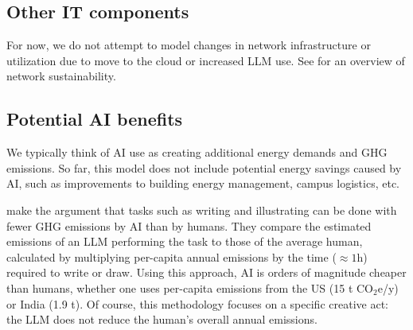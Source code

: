 \documentclass[11pt]{article}
\begin{document}
\subsection{Other IT components}

For now, we do not attempt to model changes in network infrastructure or utilization due to
move to the cloud or increased LLM use. See \textcite{jacob2023} for an overview of
network sustainability.

\subsection{Potential AI benefits}

We typically think of AI use as creating additional energy demands and GHG emissions.
So far, this model does not include potential energy savings caused by AI, such as improvements
to building energy management, campus logistics, etc.

\textcite{tomlinson2024carbon} make the argument that tasks such as writing
and illustrating can be done with fewer GHG emissions by AI than by humans. They compare the
estimated emissions of an LLM performing the task to those of the average human, calculated
by multiplying per-capita annual emissions by the time ($\approx 1$h) required to write or draw.
Using this approach, AI is orders of magnitude cheaper than humans, whether one uses per-capita
emissions from the US (15 t CO$_2$e/y) or India (1.9 t). Of course, this methodology focuses on
a specific creative act: the LLM does not reduce the human's overall annual emissions.

\printbibliography
\end{document}
